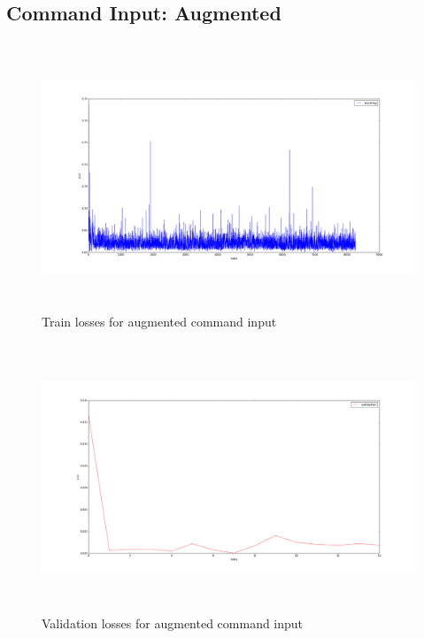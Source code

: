 \documentclass[a4paper]{article}
\begin{document}
\clearpage

\subsection{Command Input: Augmented}
  \begin{figure}[H]
    \centering
    \includegraphics[width=\textwidth, height=8cm]{../pics/command_input_training_augmented.png}
    \caption{Train losses for augmented command input}
    \label{fig:augmented_command_train_loss}
  \end{figure}
  \begin{figure}[H]
    \centering
    \includegraphics[width=\textwidth, height=8cm]{../pics/command_input_validation_augmented.png}
    
    \caption{Validation losses for augmented command input}
    \label{fig:augmented_command_eval_loss}
  \end{figure}
\end{document}
